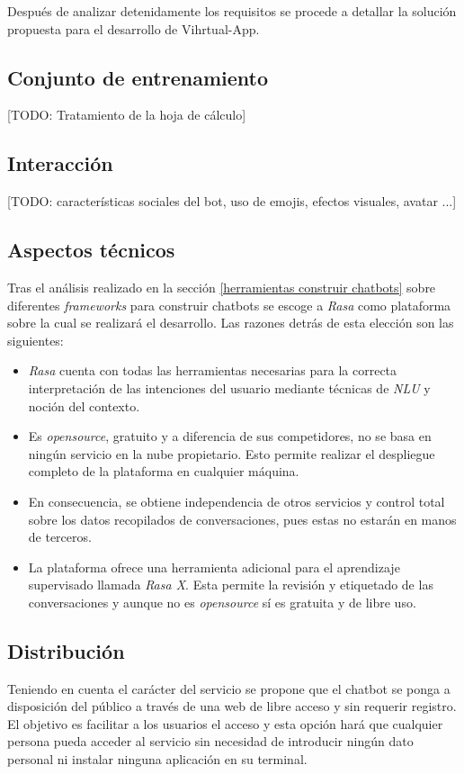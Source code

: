 Después de analizar detenidamente los requisitos se procede a detallar la solución propuesta para el desarrollo de Vihrtual-App.

\subsection{Conjunto de entrenamiento}
[TODO: Tratamiento de la hoja de cálculo]

\subsection{Interacción}
[TODO: características sociales del bot, uso de emojis, efectos visuales, avatar ...]


\subsection{Aspectos técnicos}
Tras el análisis realizado en la sección \ref{herramientas construir chatbots} sobre diferentes \textit{frameworks} para construir chatbots se escoge a \textit{Rasa} como plataforma sobre la cual se realizará el desarrollo. Las razones detrás de esta elección son las siguientes:\\ 

\begin{itemize}
	\item \textit{Rasa} cuenta con todas las herramientas necesarias para la correcta interpretación de las intenciones del usuario mediante técnicas de \textit{NLU} y noción del contexto.
	\item Es \textit{opensource}, gratuito y a diferencia de sus competidores, no se basa en ningún servicio en la nube propietario. Esto permite realizar el despliegue completo de la plataforma en cualquier máquina. 
	\item  En consecuencia, se obtiene independencia de otros servicios y control total sobre los datos recopilados de conversaciones, pues estas no estarán en manos de terceros.
	\item La plataforma ofrece una herramienta adicional para el aprendizaje supervisado llamada \textit{Rasa X}. Esta permite la revisión y etiquetado de las conversaciones y aunque no es \textit{opensource} sí es gratuita y de libre uso.
\end{itemize}	

\subsection{Distribución}
Teniendo en cuenta el carácter del servicio se propone que el chatbot se ponga a disposición del público a través de una web de libre acceso y sin requerir registro. El objetivo es facilitar a los usuarios el acceso  y esta opción hará que cualquier persona pueda acceder al servicio sin necesidad de introducir ningún dato personal ni instalar ninguna aplicación en su terminal. \\


